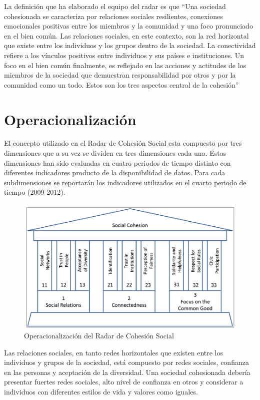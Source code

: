 \documentclass[
  12pt,
]{book}
\begin{document}
La definición que ha elaborado el equipo del radar es que ``Una sociedad
cohesionada se caracteriza por relaciones sociales resilientes,
conexiones emocionales positivas entre los miembros y la comunidad y una
foco pronunciado en el bien común. Las relaciones sociales, en este
contexto, son la red horizontal que existe entre los individuos y los
grupos dentro de la sociedad. La conectividad refiere a los vínculos
positivos entre individuos y sus países e instituciones. Un foco en el
bien común finalmente, es reflejado en las acciones y actitudes de los
miembros de la sociedad que demuestran responsabilidad por otros y por
la comunidad como un todo. Estos son los tres aspectos central de la
cohesión'' \citep{dragolov2013social, delhey_Happier_2016}

\hypertarget{operacionalizaciuxf3n-2}{%
\section{Operacionalización}\label{operacionalizaciuxf3n-2}}

El concepto utilizado en el Radar de Cohesión Social esta compuesto por
tres dimensiones que a su vez se dividen en tres dimensiones cada una.
Estas dimensiones han sido evaluadas en cuatro periodos de tiempo
distinto con diferentes indicadores producto de la disponibilidad de
datos. Para cada subdimensiones se reportarán los indicadores utilizados
en el cuarto periodo de tiempo (2009-2012).

\begin{figure}
\centering
\includegraphics{inputs/images/radar.png}
\caption{Operacionalización del Radar de Cohesión
Social}
\end{figure}

Las relaciones sociales, en tanto redes horizontales que existen entre
los individuos y grupos de la sociedad, está compuesto por redes
sociales, confianza en las personas y aceptación de la diversidad. Una
sociedad cohesionada debería presentar fuertes redes sociales, alto
nivel de confianza en otros y considerar a individuos con diferentes
estilos de vida y valores como iguales.
\end{document}
